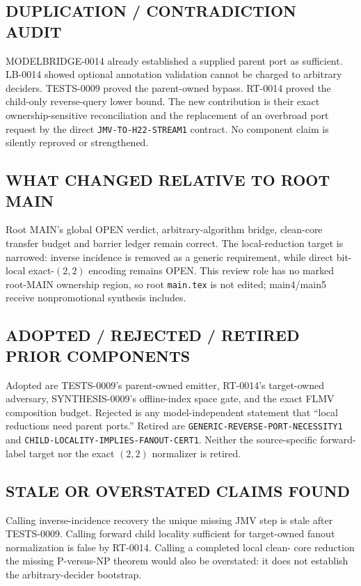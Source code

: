 \documentclass[11pt]{article}
\begin{document}
\subsection*{DUPLICATION / CONTRADICTION AUDIT}
MODELBRIDGE-0014 already established a supplied parent port as sufficient.
LB-0014 showed optional annotation validation cannot be charged to arbitrary
deciders.  TESTS-0009 proved the parent-owned bypass.  RT-0014 proved the
child-only reverse-query lower bound.  The new contribution is their exact
ownership-sensitive reconciliation and the replacement of an overbroad port
request by the direct \texttt{JMV-TO-H22-STREAM1} contract.  No component
claim is silently reproved or strengthened.

\subsection*{WHAT CHANGED RELATIVE TO ROOT MAIN}
Root MAIN's global OPEN verdict, arbitrary-algorithm bridge, clean-core
transfer budget and barrier ledger remain correct.  The local-reduction
target is narrowed: inverse incidence is removed as a generic requirement,
while direct bit-local exact-$(2,2)$ encoding remains OPEN.  This review role
has no marked root-MAIN ownership region, so root \texttt{main.tex} is not
edited; main4/main5 receive nonpromotional synthesis includes.

\subsection*{ADOPTED / REJECTED / RETIRED PRIOR COMPONENTS}
Adopted are TESTS-0009's parent-owned emitter, RT-0014's target-owned
adversary, SYNTHESIS-0009's offline-index space gate, and the exact FLMV
composition budget.  Rejected is any model-independent statement that
``local reductions need parent ports.''  Retired are
\texttt{GENERIC-REVERSE-PORT-NECESSITY1} and
\texttt{CHILD-LOCALITY-IMPLIES-FANOUT-CERT1}.  Neither the source-specific
forward-label target nor the exact $(2,2)$ normalizer is retired.

\subsection*{STALE OR OVERSTATED CLAIMS FOUND}
Calling inverse-incidence recovery the unique missing JMV step is stale after
TESTS-0009.  Calling forward child locality sufficient for target-owned
fanout normalization is false by RT-0014.  Calling a completed local clean-
core reduction the missing P-versus-NP theorem would also be overstated: it
does not establish the arbitrary-decider bootstrap.
\end{document}

